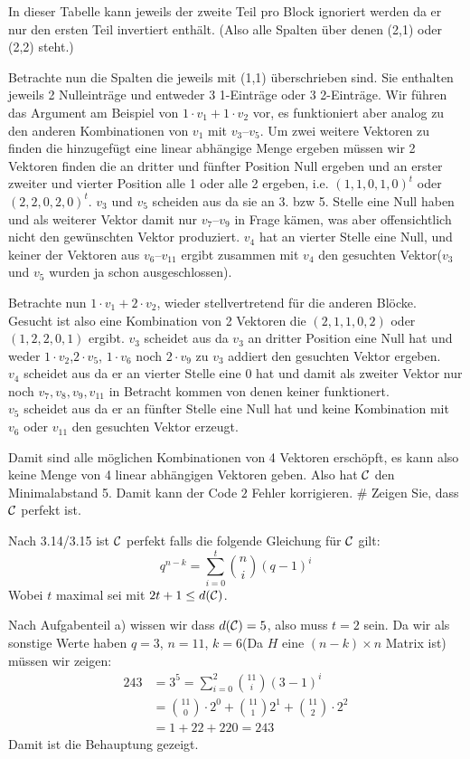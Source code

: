 \begin{myList}
In dieser Tabelle kann jeweils der zweite Teil pro Block ignoriert werden da er nur den ersten Teil invertiert enthält.
(Also alle Spalten über denen (2,1) oder (2,2) steht.)\medskip

Betrachte nun die Spalten die jeweils mit (1,1) überschrieben sind. Sie enthalten jeweils 2 Nulleinträge und entweder 3 1-Einträge oder 3 2-Einträge.
Wir führen das Argument am Beispiel von $1 \cdot v_1 + 1 \cdot v_2$ vor, es funktioniert aber analog zu den anderen Kombinationen von $v_1$ mit $v_3$--$v_5$.
Um zwei weitere Vektoren zu finden die hinzugefügt eine linear abhängige Menge ergeben müssen wir 2 Vektoren finden die an dritter und fünfter Position Null ergeben und an erster zweiter und vierter Position alle 1 oder alle 2 ergeben, i.e. $(1,1,0,1,0)^t$ oder $(2,2,0,2,0)^t$.
$v_3$ und $v_5$ scheiden aus da sie an 3. bzw 5. Stelle eine Null haben und als weiterer Vektor damit nur $v_7$--$v_9$ in Frage kämen, was aber offensichtlich nicht den gewünschten Vektor produziert.
$v_4$ hat an vierter Stelle eine Null, und keiner der Vektoren aus $v_6$--$v_{11}$ ergibt zusammen mit $v_4$ den gesuchten Vektor($v_3$ und $v_5$ wurden ja schon ausgeschlossen).\medskip

Betrachte nun $1 \cdot v_1 + 2 \cdot v_2$, wieder stellvertretend für die anderen Blöcke.
Gesucht ist also eine Kombination von 2 Vektoren die $(2,1,1,0,2)$ oder $(1,2,2,0,1)$ ergibt.
$v_3$ scheidet aus da $v_3$ an dritter Position eine Null hat und weder $1 \cdot v_2$,$2 \cdot v_5$, $1 \cdot v_6$ noch $2 \cdot v_9$ zu $v_3$ addiert den gesuchten Vektor ergeben.\\
$v_4$ scheidet aus da er an vierter Stelle eine $0$ hat und damit als zweiter Vektor nur noch $v_7,v_8,v_9,v_{11}$ in Betracht kommen von denen keiner funktionert.\\
$v_5$ scheidet aus da er an fünfter Stelle eine Null hat und keine Kombination mit $v_6$ oder $v_{11}$ den gesuchten Vektor erzeugt.\medskip

Damit sind alle möglichen Kombinationen von 4 Vektoren erschöpft, es kann also keine Menge von 4 linear abhängigen Vektoren geben.
Also hat $\mathcal{C}$ den Minimalabstand 5. Damit kann der Code $2$ Fehler korrigieren.
#
Zeigen Sie, dass $\mathcal{C}$ perfekt ist.

Nach 3.14/3.15 ist $\mathcal{C}$ perfekt falls die folgende Gleichung für $\mathcal{C}$ gilt:
\begin{equation*}
	q^{n-k} = \sum\limits^{t}_{i = 0} \binom{n}{i} (q-1)^i
\end{equation*}
Wobei $t$ maximal sei mit $2t +1 \leq d(\mathcal{C})$.

Nach Aufgabenteil a) wissen wir dass $d(\mathcal{C}) = 5$, also muss $t =  2$ sein.
Da wir als sonstige Werte haben $q = 3$, $n = 11$, $k = 6$(Da $H$ eine $(n-k) \times n$ Matrix ist) müssen wir zeigen:
\begin{align*}
	243 &=  3^5 = \sum\limits_{i = 0}^{2} \binom{11}{i} (3-1)^i \\
	&= \binom{11}{0} \cdot 2^0 + \binom{11}{1} 2^1 + \binom{11}{2} \cdot 2^2 \\
	&= 1 + 22 + 220 = 243
\end{align*}
Damit ist die Behauptung gezeigt.
\end{myList}

